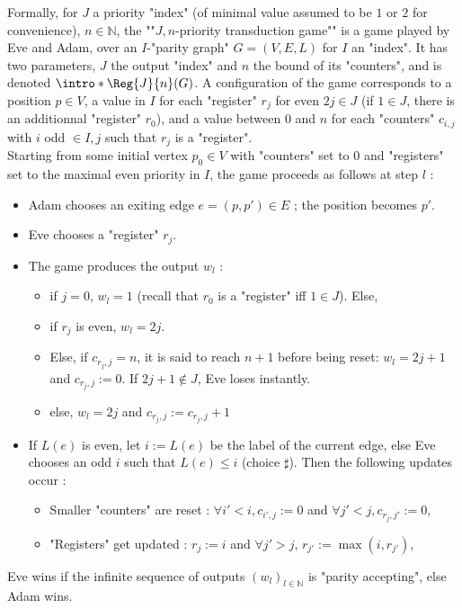 \documentclass[a4paper,UKenglish,cleveref, autoref, thm-restate]{lipics-v2021}
\newcommand{\NN}{\mathbb{N}}
\renewcommand{\leq}{\leqslant}
\begin{document}
\AP Formally, for $J$ a priority "index" (of minimal value assumed to be $1$ or $2$ for convenience), $n \in \NN$, the ""$J,n$-priority transduction game"" is a game played by Eve and Adam, over an $I$-"parity graph" $G=(V,E,L)$ for $I$ an "index". It has two parameters, $J$ the output "index" and $n$ the bound of its "counters", and is denoted $\intro*{\Reg{J}{n}}(G)$. A configuration of the game corresponds to a position $p\in V$, a value in $I$ for each \reintro*"register" $r_j$ for even $2j\in J$ (if $1 \in J$, there is an additionnal "register" $r_0$), and a value between $0$ and $n$ for each \reintro*"counters" $c_{i,j}$ with $i$ odd $\in I, j$ such that $r_j$ is a "register".\\
Starting from some initial vertex $p_0\in V$ with "counters" set to $0$ and "registers" set to the maximal even priority in $I$, the game proceeds as follows at step $l$ :
\begin{itemize}
	\item Adam chooses an exiting edge $e = (p,p')\in E$ ; the position becomes $p'$.
	\item Eve chooses a "register" $r_j$.
	\item The game produces the output $w_l$ :
		\begin{itemize}
		\item if $j = 0$, $w_l=1$ (recall that $r_0$ is a "register" iff $1 \in J$). Else,
		\item if $r_j$ is even, $w_l=2j$.
		\item Else, if $c_{r_j,j} = n$, it is said to reach $n+1$ before being reset: $w_l=2j+1$ and $c_{r_j,j} := 0$. If $2j+1 \notin J$, Eve loses instantly.
		\item else, $w_l = 2j$ and $c_{r_j,j} := c_{r_j,j} +1$
		\end{itemize}
	\item If $L(e)$ is even, let $i:= L(e)$ be the label of the current edge, else Eve chooses an odd $i$ such that $L(e)\leq i$ (choice $\sharp$\label{sharp}). 
	Then the following updates occur : 
	\begin{itemize}
		\item Smaller "counters" are reset : $\forall i' < i, c_{i',j} := 0$ and $ \forall j'<j, c_{r_j,j'} := 0$,
		\item "Registers" get updated : $r_j := i$ and $\forall j' > j$, $ r_{j'} := \max(i, r_{j'}) $, 
	\end{itemize} 
\end{itemize}
Eve wins if the infinite sequence of outputs $(w_l)_{l\in \NN}$ is "parity accepting", else Adam wins.\\
\end{document}
